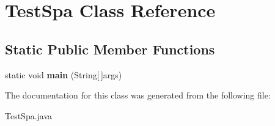 \hypertarget{class_test_spa}{}\section{Test\+Spa Class Reference}
\label{class_test_spa}
\subsection*{Static Public Member Functions}
\begin{DoxyCompactItemize}
\item 
static void {\bfseries main} (String\mbox{[}$\,$\mbox{]}args)\hypertarget{class_test_spa_ab9d6c8527b26b91064c889d97de185dc}{}\label{class_test_spa_ab9d6c8527b26b91064c889d97de185dc}

\end{DoxyCompactItemize}


The documentation for this class was generated from the following file\+:\begin{DoxyCompactItemize}
\item 
Test\+Spa.\+java\end{DoxyCompactItemize}
